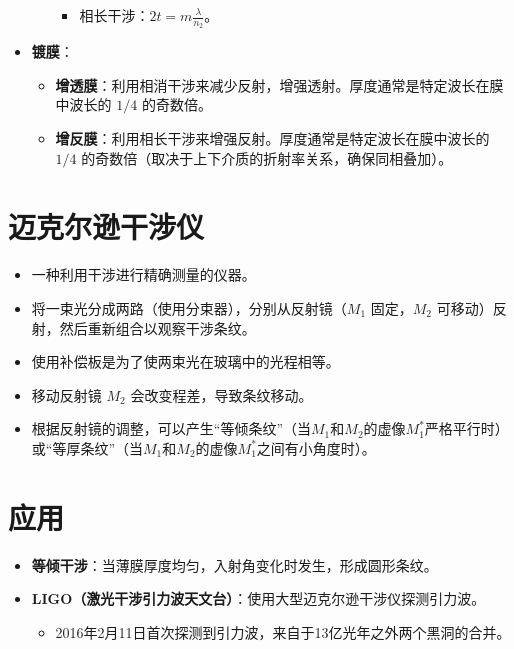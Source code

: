 \documentclass[UTF8]{ctexart}
\begin{document}
\begin{itemize}
\begin{itemize}
                \begin{itemize}
                     \item 相长干涉：$2t = m\frac{\lambda}{n_2}$。
                \end{itemize}
        \end{itemize}
    \item \textbf{镀膜}：
        \begin{itemize}
            \item \textbf{增透膜}：利用相消干涉来减少反射，增强透射。厚度通常是特定波长在膜中波长的 $1/4$ 的奇数倍。
            \item \textbf{增反膜}：利用相长干涉来增强反射。厚度通常是特定波长在膜中波长的 $1/4$ 的奇数倍（取决于上下介质的折射率关系，确保同相叠加）。
        \end{itemize}
\end{itemize}

\section{迈克尔逊干涉仪}
\begin{itemize}
    \item 一种利用干涉进行精确测量的仪器。
    \item 将一束光分成两路（使用分束器），分别从反射镜（$M_1$ 固定，$M_2$ 可移动）反射，然后重新组合以观察干涉条纹。
    \item 使用补偿板是为了使两束光在玻璃中的光程相等。
    \item 移动反射镜 $M_2$ 会改变程差，导致条纹移动。
    \item 根据反射镜的调整，可以产生“等倾条纹”（当$M_1$和$M_2$的虚像$M_1^*$严格平行时）或“等厚条纹”（当$M_1$和$M_2$的虚像$M_1^*$之间有小角度时）。
\end{itemize}

\section{应用}
\begin{itemize}
    \item \textbf{等倾干涉}：当薄膜厚度均匀，入射角变化时发生，形成圆形条纹。
    \item \textbf{LIGO（激光干涉引力波天文台）}：使用大型迈克尔逊干涉仪探测引力波。
        \begin{itemize}
            \item 2016年2月11日首次探测到引力波，来自于13亿光年之外两个黑洞的合并。
        \end{itemize}
\end{itemize}
\end{document}
